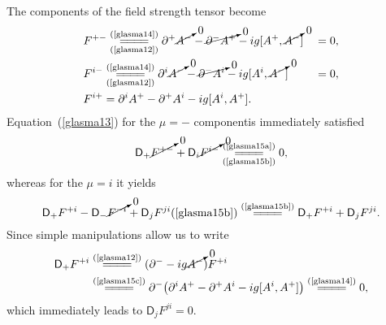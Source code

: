 \begin{note}
    The components of the field strength tensor become
    \begin{subequations}
        \begin{align}
        &F^{+-}\underset{(\text{\cref{glasma12}})}{\stackrel{(\text{\cref{glasma14}})}{=\joinrel=\joinrel=\joinrel=}}\partial^+\cancelto{0}{A^-}-\cancelto{0}{\partial^-A^+}-ig[A^+,\cancelto{0}{A^-}]&&=0,\label{glasma15a}\\
        &F^{i-}\underset{(\text{\cref{glasma12}})}{\stackrel{(\text{\cref{glasma14}})}{=\joinrel=\joinrel=\joinrel=}}\partial^i\cancelto{0}{A^-}-\cancelto{0}{\partial^-A^i}-ig[A^i,\cancelto{0}{A^-}]&&=0,\label{glasma15b}\\
        &F^{i+}=\partial^iA^+-\partial^+A^i-ig[A^i,A^+].\label{glasma15c}
     \end{align}
    \end{subequations}
    Equation~(\cref{glasma13}) for the $\mu=-$ componentis immediately satisfied
    \begin{equation*}
        \textsf{D}_+\cancelto{0}{F^{+-}}+\textsf{D}_i\cancelto{0}{F^{i-}}\underset{(\text{\cref{glasma15b}})}{\stackrel{(\text{\cref{glasma15a}})}{=\joinrel=\joinrel=\joinrel=}}0,
    \end{equation*}
    whereas for the $\mu=i$ it yields
    \begin{equation*}
        \textsf{D}_+F^{+i}-\textsf{D}_-\cancelto{0}{F^{-i}}+\textsf{D}_jF^{ji}(\text{\cref{glasma15b}})\stackrel{(\text{\cref{glasma15b}})}{=\joinrel=\joinrel=\joinrel=} \textsf{D}_+F^{+i}+\textsf{D}_jF^{ji}.
    \end{equation*}
    Since simple manipulations allow us to write
    \begin{equation*}
        \begin{aligned}
        \textsf{D}_+F^{+i}&\stackrel{(\text{\cref{glasma12}})}{=\joinrel=\joinrel=\joinrel=}(\partial^--ig\cancelto{0}{A^-})F^{+i}\\
        &\stackrel{(\text{\cref{glasma15c}})}{=\joinrel=\joinrel=\joinrel=}\partial^-\big(\partial^iA^+-\partial^+A^i-ig[A^i,A^+]\big)\stackrel{(\text{\cref{glasma14}})}{=\joinrel=\joinrel=\joinrel=}0,
        \end{aligned}
    \end{equation*}
    which immediately leads to $\textsf{D}_jF^{ji}=0$.
\end{note}

